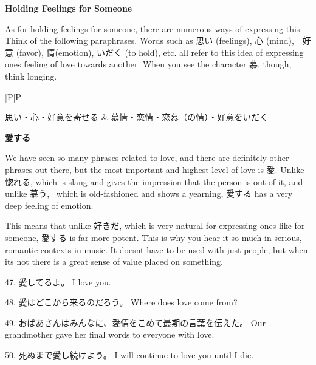 \begin{center}
\textbf{Holding Feelings for Someone } 
\end{center}

\par{ As for holding feelings for someone, there are numerous ways of expressing this. Think of the following paraphrases. Words such as 思い (feelings), 心 (mind),　好意 (favor), 情(emotion), いだく (to hold), etc. all refer to this idea of expressing one\textquotesingle s feeling of love towards another. When you see the character 慕, though, think longing. }

\begin{ltabulary}{|P|P|}
\hline 

思い・心・好意を寄せる & 慕情・恋情・恋慕（の情）・好意をいだく \\ 

\end{ltabulary}

\begin{center}
\textbf{愛する }
\end{center}

\par{ We have seen so many phrases related to love, and there are definitely other phrases out there, but the most important and highest level of love is 愛. Unlike 惚れる, which is slang and gives the impression that the person is out of it, and unlike 慕う,  which is old-fashioned and shows a yearning, 愛する has a very deep feeling of emotion. }

\par{ This means that unlike 好きだ, which is very natural for expressing one\textquotesingle s like for someone, 愛する is far more potent. This is why you hear it so much in serious, romantic contexts in music. It doesn\textquotesingle t have to be used with just people, but when it\textquotesingle s not there is a great sense of value placed on something. }

\par{47. 愛してるよ。 \hfill\break
I love you. }

\par{48. 愛はどこから来るのだろう。 \hfill\break
Where does love come from? }

\par{49. おばあさんはみんなに、愛情をこめて最期の言葉を伝えた。 \hfill\break
Our grandmother gave her final words to everyone with love. }

\par{50. 死ぬまで愛し続けよう。 \hfill\break
I will continue to love you until I die. }

